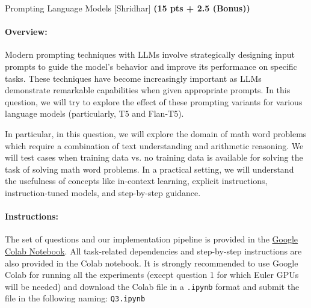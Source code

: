 \begin{question}{
Prompting Language Models [Shridhar] \textbf{(15 pts + 2.5 (Bonus))}}

\paragraph{Overview:}
Modern prompting techniques with LLMs involve strategically designing input prompts to guide the model's behavior and improve its performance on specific tasks. These techniques have become increasingly important as LLMs  demonstrate remarkable capabilities when given appropriate prompts. %
In this question, we will try to explore the effect of these prompting variants for various language models (particularly, T5 and Flan-T5). 

In particular, in this question, we will explore the domain of math word problems which require a combination of text understanding and arithmetic reasoning.
We will test cases when training data vs. no training data is available for solving the task of solving math word problems.  In a practical setting, we will understand the usefulness of concepts like in-context learning, explicit instructions, instruction-tuned models, and step-by-step guidance. 


\paragraph{Instructions:}
The set of questions and our implementation pipeline is provided in the \href{https://colab.research.google.com/drive/1oj3uqSrS76vmVd1shKriCXaIYZJ9sGrB?usp=sharing}{Google Colab Notebook}. 
All task-related dependencies and step-by-step instructions are also provided in the Colab notebook. It is strongly recommended to use Google Colab for running all the experiments (except question 1 for which Euler GPUs will be needed) and download the Colab file in a \texttt{.ipynb} format and submit the file in the following naming: \texttt{Q3.ipynb}


\end{question}